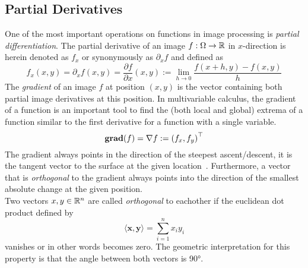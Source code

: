 \subsection{Partial Derivatives}
One of the most important operations on functions in image processing is \textit{partial
    differentiation}.
The partial derivative of an image $f: \Omega \rightarrow \mathbb{R}$ in $x$-direction is herein denoted as $f_x$ or
synonymously as $\partial_x f$ and defined as
\begin{equation}
    f_x(x, y) = \partial_x f (x, y) = \frac{\partial f}{\partial x} (x, y) := \lim_{h \to 0}\frac{f(x+h, y) -f(x, y)}{h} 
\end{equation}
The \textit{gradient} of an image $f$ at position $(x, y)$ is the vector containing both partial
image derivatives at this position.\newpage\noindent
In multivariable calculus, the gradient of a function is an important tool to find the (both local
and global) extrema of a function similar to the first derivative for a function with a single
variable.
\begin{equation}
    \textbf{grad}(f) = \mathbf{\nabla} f := {\left(f_x, f_y\right)}^\top\label{def:Grad}
\end{equation}
The gradient always points in the direction of the steepest ascent/descent, it is the tangent
vector to the surface at the given location~\cite{mfi3}. Furthermore, a vector that is
\textit{orthogonal} to the gradient always points into the direction of the smallest absolute
change at the given position.\\
Two vectors $x,y\in\mathbb{R}^n$ are called \textit{orthogonal} to eachother if the euclidean dot product defined by 
\begin{equation}
    \langle\mathbf{x}, \mathbf{y}\rangle = \sum_{i=1}^n x_{i}y_i
\end{equation}
vanishes or in other words becomes zero.
The geometric interpretation for this property is that the angle between both vectors is 90°.

